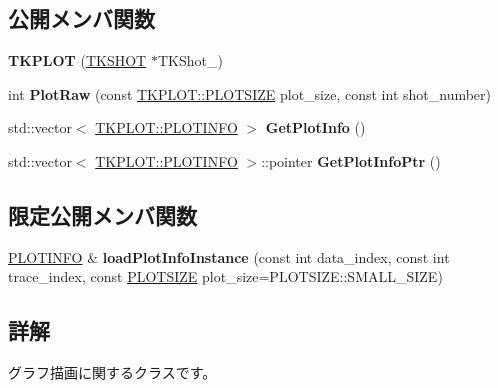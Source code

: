 \subsection*{公開メンバ関数}
\begin{DoxyCompactItemize}
\item 
\mbox{\label{class_t_k_p_l_o_t_aeb9168bcf7e45c45fc38dab63e6b90b3}} 
{\bfseries T\+K\+P\+L\+OT} (\hyperlink{class_t_k_s_h_o_t}{T\+K\+S\+H\+OT} $\ast$T\+K\+Shot\+\_\+)
\item 
\mbox{\label{class_t_k_p_l_o_t_af863044c92051bc4abc66911273d5f3e}} 
int {\bfseries Plot\+Raw} (const \hyperlink{class_t_k_p_l_o_t_a158082ae168750554cf23edde9a27416}{T\+K\+P\+L\+O\+T\+::\+P\+L\+O\+T\+S\+I\+ZE} plot\+\_\+size, const int shot\+\_\+number)
\item 
\mbox{\label{class_t_k_p_l_o_t_a5ddc4ef2a68d8649cfb2aebf507121fd}} 
std\+::vector$<$ \hyperlink{class_t_k_p_l_o_t_1_1_p_l_o_t_i_n_f_o}{T\+K\+P\+L\+O\+T\+::\+P\+L\+O\+T\+I\+N\+FO} $>$ {\bfseries Get\+Plot\+Info} ()
\item 
\mbox{\label{class_t_k_p_l_o_t_a4087cc1a73e760ac8eb32cbdf78a4433}} 
std\+::vector$<$ \hyperlink{class_t_k_p_l_o_t_1_1_p_l_o_t_i_n_f_o}{T\+K\+P\+L\+O\+T\+::\+P\+L\+O\+T\+I\+N\+FO} $>$\+::pointer {\bfseries Get\+Plot\+Info\+Ptr} ()
\end{DoxyCompactItemize}
\subsection*{限定公開メンバ関数}
\begin{DoxyCompactItemize}
\item 
\mbox{\label{class_t_k_p_l_o_t_aae92c92917093101c52d08d132aee75b}} 
\hyperlink{class_t_k_p_l_o_t_1_1_p_l_o_t_i_n_f_o}{P\+L\+O\+T\+I\+N\+FO} \& {\bfseries load\+Plot\+Info\+Instance} (const int data\+\_\+index, const int trace\+\_\+index, const \hyperlink{class_t_k_p_l_o_t_a158082ae168750554cf23edde9a27416}{P\+L\+O\+T\+S\+I\+ZE} plot\+\_\+size=P\+L\+O\+T\+S\+I\+Z\+E\+::\+S\+M\+A\+L\+L\+\_\+\+S\+I\+ZE)
\end{DoxyCompactItemize}


\subsection{詳解}
グラフ描画に関するクラスです。 

